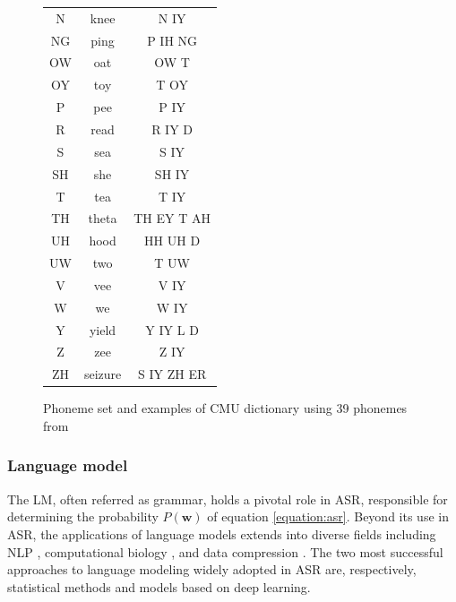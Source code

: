 \begin{figure}
\begin{minipage}[t]{0.5\textwidth}
\begin{tabular}{ccc}
            N & knee & N IY \\
            NG & ping & P IH NG \\
            OW & oat & OW T \\
            OY & toy & T OY \\
            P & pee & P IY \\
            R & read & R IY D \\
            S & sea & S IY \\
            SH & she & SH IY \\
            T & tea & T IY \\
            TH & theta & TH EY T AH \\
            UH & hood & HH UH D \\
            UW & two & T UW \\
            V & vee & V IY \\
            W & we & W IY \\
            Y & yield & Y IY L D \\
            Z & zee & Z IY \\
            ZH & seizure & S IY ZH ER \\
            \hline
        \end{tabular}
    \end{minipage}
    \caption{Phoneme set and examples of CMU dictionary using 39 phonemes from \cite{weide1998carnegie}}
    \label{CMU_DICT}
\end{figure}


\subsubsection{Language model}%
The \ac{LM}, often referred as grammar, holds a pivotal role in \ac{ASR}, responsible for determining the probability $P(\boldsymbol{w})$ of equation \ref{equation:asr}. Beyond its use in \ac{ASR}, the applications of language models extends into diverse fields including \ac{NLP} \cite{n-grams-NLP}, computational biology  \cite{n-grams-computational_biology}, and data compression \cite{n-gram-compression}. The two most successful approaches to language modeling widely adopted in \ac{ASR} are, respectively, statistical methods and models based on deep learning. 


